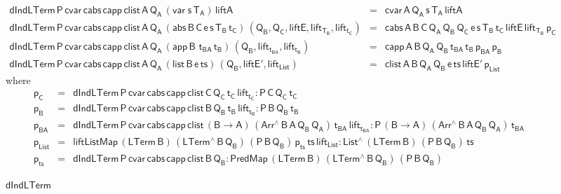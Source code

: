 \documentclass[sigplan,10pt,anonymous,review]{acmart}
\begin{document}
\begin{figure*}[t]
\begin{adjustbox}{varwidth=7.3in, max width=7.1in, margin=-0.0in 0in
      -0.2in 0in, fbox, center}
{\small
\[\begin{array}{lll}
\mathsf{dIndLTerm \, P\, cvar \, cabs\, capp\, clist \, A\, Q_A\,
  (var\;s\,T_A) \, liftA} & = & \mathsf{cvar \, A\, Q_A\, s\, T_A\,
  liftA}\\ 
\mathsf{dIndLTerm \, P\, cvar \, cabs\, capp\, clist \, A\, Q_A\,
  (abs \,B \,C \,e \,s \,T_B \, t_C) \, (Q_B , Q_C , liftE,
  lift_{T_B}, lift_{t_C})} & = & \mathsf{cabs\,A\,B\,C\, Q_A\,
  Q_B\, Q_C\, e\, s\, T_B\, t_C\, liftE\, lift_{T_B}\, p_C}\\
\mathsf{dIndLTerm \, P\, cvar \, cabs\, capp\, clist \, A\, Q_A\,
    (app \,B \,\,t_{BA} \, t_B)\, (Q_B , lift_{t_{BA}}, lift_{t_B})} &
= & \mathsf{capp\,A\,B\,Q_A\, Q_B\, t_{BA}\, t_B\, p_{BA} \, p_B}\\
  \mathsf{dIndLTerm \, P\, cvar \, cabs\, capp\, clist \, A\, Q_A\,
    (list \,B \,e \, ts) \, (Q_B , liftE', lift_{List})} & = & 
  \mathsf{clist \,A\,B\,Q_A\, Q_B\, e\, ts\, liftE'\, p_{List} }
\end{array}\]}
\mbox{where}
{\small
\[\begin{array}{lll}
\mathsf{p_C} & = & \mathsf{dIndLTerm\,P\,cvar\,cabs \,capp \,clist\,
  C\, Q_C\, t_C\, lift_{t_C} : P \, C\, Q_C \, t_C }\\
\mathsf{p_B} & = & \mathsf{dIndLTerm\,P\,cvar\,cabs \,capp \,clist\,
  B\, Q_B\, t_B\, lift_{t_B} : P \, B\, Q_B \, t_B }\\
\mathsf{p_{BA}} & = & \mathsf{dIndLTerm\,P\,cvar\,cabs \,capp
  \,clist\, (B \to A)\,(Arr^{\wedge} \, B\, A\, Q_B \, Q_A) \,
  t_{BA}\, lift_{t_{BA}} : P \, (B \to A)\, (Arr^{\wedge} \, B\, A\,
  Q_B \, Q_A) \, t_{BA}}\\ 
\mathsf{p_{List}} & = &\mathsf{liftListMap \, (LTerm\, B) \,
  (LTerm^{\wedge} \, B \, Q_B)\, (P\,B\,Q_B)\, p_{ts} \, ts\,
  lift_{List} : List^{\wedge}\, (LTerm\,B) \, (P\,B\,Q_B) \, ts}\\
\mathsf{p_{ts}} & = & \mathsf{dIndLTerm\, P\, cvar\, cabs\, capp\,
  clist\, B\, Q_B : PredMap\,(LTerm\,B) \,(LTerm^{\wedge}\, B\, Q_B)
  \, (P\,B\,Q_B)}
\end{array}\]}

\vspace*{-0.1in}

\caption{$\mathsf{dIndLTerm}$}\label{fig:dindlterm} \vspace*{0.1in} 
\end{adjustbox}
\end{figure*}
\end{document}
